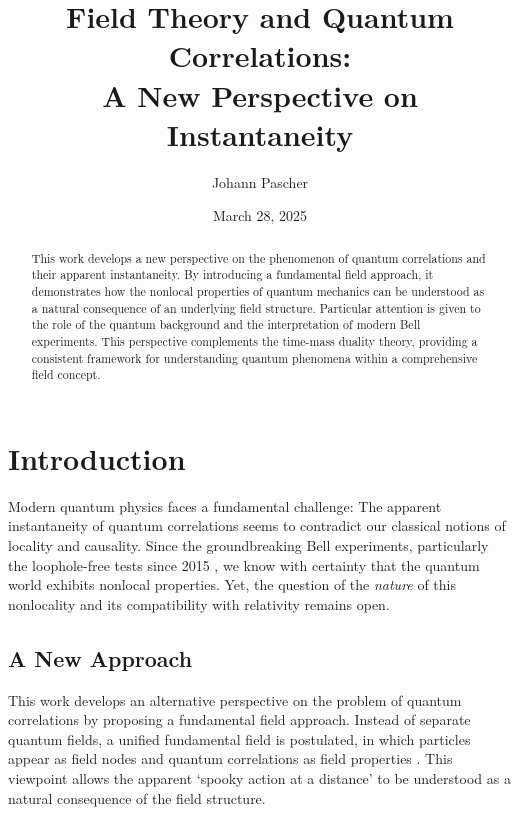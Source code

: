 \documentclass[12pt,a4paper]{article}
\title{Field Theory and Quantum Correlations: \\ A New Perspective on Instantaneity}
\author{Johann Pascher}
\date{March 28, 2025}
\begin{document}
	
	\maketitle
	
	\begin{abstract}
		This work develops a new perspective on the phenomenon of quantum correlations and their apparent instantaneity. By introducing a fundamental field approach, it demonstrates how the nonlocal properties of quantum mechanics can be understood as a natural consequence of an underlying field structure. Particular attention is given to the role of the quantum background and the interpretation of modern Bell experiments. This perspective complements the time-mass duality theory, providing a consistent framework for understanding quantum phenomena within a comprehensive field concept.
	\end{abstract}
	
	\tableofcontents
	\newpage
	
	\section{Introduction}
	Modern quantum physics faces a fundamental challenge: The apparent instantaneity of quantum correlations seems to contradict our classical notions of locality and causality. Since the groundbreaking Bell experiments, particularly the loophole-free tests since 2015 \cite{Hensen2015}\relax, we know with certainty that the quantum world exhibits nonlocal properties. Yet, the question of the \textit{nature} of this nonlocality and its compatibility with relativity remains open.
	
	\subsection{A New Approach}
	This work develops an alternative perspective on the problem of quantum correlations by proposing a fundamental field approach. Instead of separate quantum fields, a unified fundamental field is postulated, in which particles appear as field nodes and quantum correlations as field properties \cite{Wilczek2008}\relax. This viewpoint allows the apparent `spooky action at a distance' to be understood as a natural consequence of the field structure.
	
\end{document}

